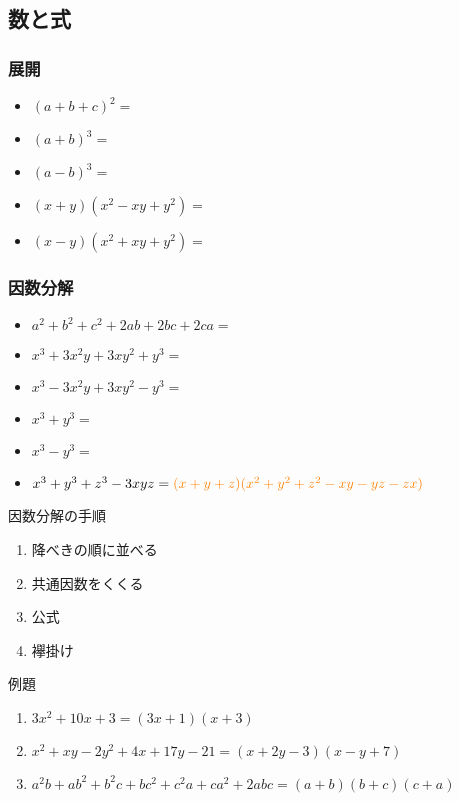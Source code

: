 \documentclass[10pt,dvipdfmx]{jsarticle}
\newcommand{\answer}[2]{{\color{orange}#2}}
\newcommand{\answer}[2]{\vspace{#1mm}}
\begin{document}
\subsection*{数と式}
\subsubsection*{展開}
\begin{Large}
  \begin{itemize}
    \item $(a+b+c)^2=$
    \item $(a+b)^3=$
    \item $(a-b)^3=$
    \item $(x+y)(x^2-xy+y^2)=$
    \item $(x-y)(x^2+xy+y^2)=$
  \end{itemize}
\end{Large}

\subsubsection*{因数分解}
\begin{Large}
  \begin{itemize}
    \item $a^2+b^2+c^2+2ab+2bc+2ca=$
    \item $x^3+3x^2y+3xy^2+y^3=$
    \item  $x^3-3x^2y+3xy^2-y^3=$
    \item $x^3+y^3=$
    \item $x^3-y^3=$
    \item $x^3+y^3+z^3-3xyz=\answer{0}{(x+y+z)(x^2+y^2+z^2-xy-yz-zx)}$
  \end{itemize}
\end{Large}
\begin{itembox}[l]{因数分解の手順}
  \begin{Large}
    \begin{enumerate}
      \item \answer{0}{降べきの順に並べる}
      \item \answer{0}{共通因数をくくる}%
      \item \answer{0}{公式} %
      \item \answer{0}{襷掛け} %
    \end{enumerate}
  \end{Large}
\end{itembox}

\begin{itembox}[l]{例題}
  \begin{large}
    \begin{enumerate}
      \item $3x^2+10x+3=$\answer{0}{$(3x+1)(x+3)$}
      \item $x^2+xy-2y^2+4x+17y-21=$\answer{0}{$(x+2y-3)(x-y+7)$}
      \item $a^2b+ab^2+b^2c+bc^2+c^2a+ca^2+2abc=$\answer{0}{$(a+b)(b+c)(c+a)$}
    \end{enumerate}
  \end{large}
\end{itembox}
\end{document}
